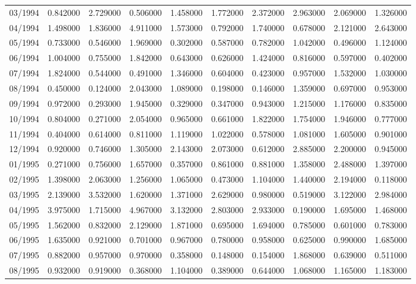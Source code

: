 \begin{tabular}{lrrrrrrrrr}
03/1994 & 0.842000 & 2.729000 & 0.506000 & 1.458000 & 1.772000 & 2.372000 & 2.963000 & 2.069000 & 1.326000 \\
04/1994 & 1.498000 & 1.836000 & 4.911000 & 1.573000 & 0.792000 & 1.740000 & 0.678000 & 2.121000 & 2.643000 \\
05/1994 & 0.733000 & 0.546000 & 1.969000 & 0.302000 & 0.587000 & 0.782000 & 1.042000 & 0.496000 & 1.124000 \\
06/1994 & 1.004000 & 0.755000 & 1.842000 & 0.643000 & 0.626000 & 1.424000 & 0.816000 & 0.597000 & 0.402000 \\
07/1994 & 1.824000 & 0.544000 & 0.491000 & 1.346000 & 0.604000 & 0.423000 & 0.957000 & 1.532000 & 1.030000 \\
08/1994 & 0.450000 & 0.124000 & 2.043000 & 1.089000 & 0.198000 & 0.146000 & 1.359000 & 0.697000 & 0.953000 \\
09/1994 & 0.972000 & 0.293000 & 1.945000 & 0.329000 & 0.347000 & 0.943000 & 1.215000 & 1.176000 & 0.835000 \\
10/1994 & 0.804000 & 0.271000 & 2.054000 & 0.965000 & 0.661000 & 1.822000 & 1.754000 & 1.946000 & 0.777000 \\
11/1994 & 0.404000 & 0.614000 & 0.811000 & 1.119000 & 1.022000 & 0.578000 & 1.081000 & 1.605000 & 0.901000 \\
12/1994 & 0.920000 & 0.746000 & 1.305000 & 2.143000 & 2.073000 & 0.612000 & 2.885000 & 2.200000 & 0.945000 \\
01/1995 & 0.271000 & 0.756000 & 1.657000 & 0.357000 & 0.861000 & 0.881000 & 1.358000 & 2.488000 & 1.397000 \\
02/1995 & 1.398000 & 2.063000 & 1.256000 & 1.065000 & 0.473000 & 1.104000 & 1.440000 & 2.194000 & 0.118000 \\
03/1995 & 2.139000 & 3.532000 & 1.620000 & 1.371000 & 2.629000 & 0.980000 & 0.519000 & 3.122000 & 2.984000 \\
04/1995 & 3.975000 & 1.715000 & 4.967000 & 3.132000 & 2.803000 & 2.933000 & 0.190000 & 1.695000 & 1.468000 \\
05/1995 & 1.562000 & 0.832000 & 2.129000 & 1.871000 & 0.695000 & 1.694000 & 0.785000 & 0.601000 & 0.783000 \\
06/1995 & 1.635000 & 0.921000 & 0.701000 & 0.967000 & 0.780000 & 0.958000 & 0.625000 & 0.990000 & 1.685000 \\
07/1995 & 0.882000 & 0.957000 & 0.970000 & 0.358000 & 0.148000 & 0.154000 & 1.868000 & 0.639000 & 0.511000 \\
08/1995 & 0.932000 & 0.919000 & 0.368000 & 1.104000 & 0.389000 & 0.644000 & 1.068000 & 1.165000 & 1.183000 \\

\end{tabular}
